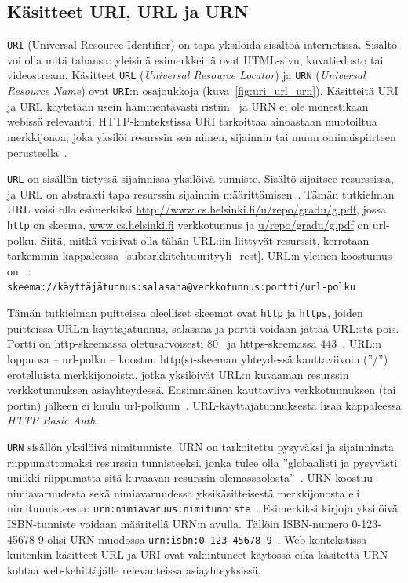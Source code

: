 \documentclass[finnish,gradu]{tktltiki}
\begin{document}
  \subsection{Käsitteet URI, URL ja URN} %
  \label{sub:käsitteet_uri_url_ja_urn}

  \verb!URI! (Universal Resource Identifier) on tapa yksilöidä sisältöä internetissä. Sisältö voi olla mitä tahansa: yleisinä esimerkkeinä ovat HTML-sivu, kuvatiedosto tai videostream. Käsitteet \verb!URL! (\emph{Universal Resource Locator}) ja \verb!URN! (\emph{Universal Resource Name}) ovat \verb!URI!:n osajoukkoja (kuva~\ref{fig:uri_url_urn}). Käsitteitä URI ja URL käytetään usein hämmentävästi ristiin~\cite{w3c_uri_clarifications} ja URN ei ole monestikaan webissä relevantti. HTTP-kontekstissa URI tarkoittaa ainoastaan muotoiltua merkkijonoa, joka yksilöi resurssin sen nimen, sijainnin tai muun ominaispiirteen perusteella~\cite{ietf_rfc_http1.1}.

  \verb!URL! on sisällön tietyssä sijainnissa yksilöivä tunniste. Sisältö sijaitsee resurssissa, ja URL on abstrakti tapa resurssin sijainnin määrittämisen~\cite{ietf_rfc_urls}. Tämän tutkielman URL voisi olla esimerkiksi \url{http://www.cs.helsinki.fi/u/repo/gradu/g.pdf}, jossa \verb!http! on skeema, \url{www.cs.helsinki.fi} verkkotunnus ja \url{u/repo/gradu/g.pdf} on url-polku. Siitä, mitkä voisivat olla tähän URL:iin liittyvät resurssit, kerrotaan tarkemmin kappaleessa~\ref{sub:arkkitehtuurityyli_rest}. URL:n yleinen koostumus on ~\cite{ietf_rfc_urls}:
  \\ \verb!skeema://käyttäjätunnus:salasana@verkkotunnus:portti/url-polku!

  Tämän tutkielman puitteissa oleelliset skeemat ovat \verb!http! ja \verb!https!, joiden puitteissa URL:n käyttäjätunnus, salasana ja portti voidaan jättää URL:sta pois. Portti on http-skeemassa oletusarvoisesti 80~\cite{ietf_rfc_urls} ja https-skeemassa 443~\cite{ietf_rfc_http_tls}. URL:n loppuosa -- url-polku -- koostuu http(s)-skeeman yhteydessä kauttaviivoin (''/'') erotelluista merkkijonoista, jotka yksilöivät URL:n kuvaaman resurssin verkkotunnuksen asiayhteydessä. Ensimmäinen kauttaviiva verkkotunnuksen (tai portin) jälkeen ei kuulu url-polkuun~\cite{ietf_rfc_urls}. URL-käyttäjätunnuksesta lisää kappaleessa \emph{HTTP Basic Auth}.


  \verb!URN! sisällön yksilöivä nimitunniste. URN on tarkoitettu pysyväksi ja sijainninsta riippumattomaksi resurssin tunnisteeksi, jonka tulee olla ''globaalisti ja pysyvästi uniikki riippumatta sitä kuvaavan resurssin olemassaolosta''~\cite{ietf_rfc_uri_syntax}. URN koostuu nimiavaruudesta sekä nimiavaruudessa yksikäsitteisestä merkkijonosta eli nimitunnisteesta: \verb!urn:nimiavaruus:nimitunniste!~\cite{ietf_rfc_urn_syntax}. Esimerkiksi kirjoja yksilöivä ISBN-tunniste voidaan määritellä URN:n avulla. Tällöin ISBN-numero 0-123-45678-9 olisi URN-muodossa \verb!urn:isbn:0-123-45678-9!~\cite{w3c_uri_clarifications}. Web-kontekstissa kuitenkin käsitteet URL ja URI ovat vakiintuneet käytössä eikä käsitettä URN kohtaa web-kehittäjälle relevanteissa asiayhteyksissä.
\end{document}
